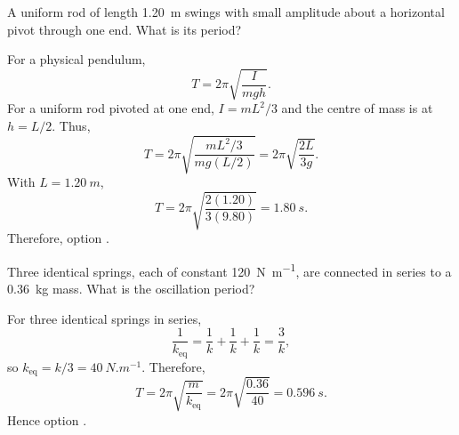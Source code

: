 \begin{quizquestion}[
  id=phy104-osc-022,
  topic=oscillations,
  difficulty=applied,
  marks=2,
  correct=D,
  tags={physical-pendulum,rod,period},
  outcome={Calculate the period of a rod as a physical pendulum}
]
  A uniform rod of length \SI{1.20}{m} swings with small amplitude about a horizontal pivot through one end. What is its period?
\end{quizquestion}
\begin{quizsolution}
  For a physical pendulum,
    \[
      T=2\pi\sqrt{\frac{I}{mgh}}.
    \]
    For a uniform rod pivoted at one end, \(I=mL^2/3\) and the centre of mass is at \(h=L/2\). Thus,
    \[
      T=2\pi\sqrt{\frac{mL^2/3}{mg(L/2)}}
      =2\pi\sqrt{\frac{2L}{3g}}.
    \]
    With \(L=\SI{1.20}{m}\),
    \[
      T=2\pi\sqrt{\frac{2(1.20)}{3(9.80)}}=\SI{1.80}{s}.
    \]
    Therefore, option \textbf{\quizcorrectletter}.
\end{quizsolution}

\begin{quizquestion}[
  id=phy104-osc-023,
  topic=oscillations,
  difficulty=applied,
  marks=2,
  correct=C,
  tags={springs,series,effective-stiffness},
  outcome={Determine the period for springs connected in series}
]
  Three identical springs, each of constant \SI{120}{N.m^{-1}}, are connected in series to a \SI{0.36}{kg} mass. What is the oscillation period?
\end{quizquestion}
\begin{quizsolution}
  For three identical springs in series,
    \[
      \frac{1}{k_{\mathrm{eq}}}=\frac{1}{k}+\frac{1}{k}+\frac{1}{k}=\frac{3}{k},
    \]
    so \(k_{\mathrm{eq}}=k/3=\SI{40}{N.m^{-1}}\). Therefore,
    \[
      T=2\pi\sqrt{\frac{m}{k_{\mathrm{eq}}}}
      =2\pi\sqrt{\frac{0.36}{40}}
      =\SI{0.596}{s}.
    \]
    Hence option \textbf{\quizcorrectletter}.
\end{quizsolution}

